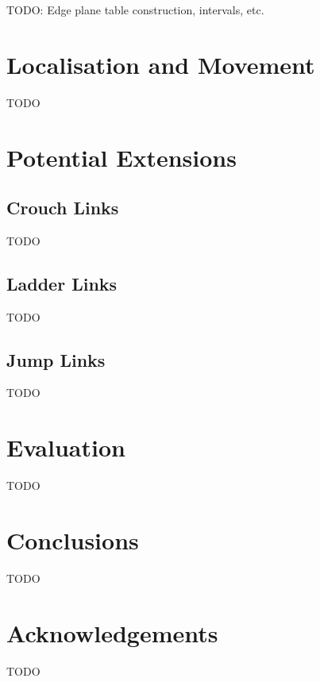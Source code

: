 \documentclass[12pt,onecolumn]{article}
\begin{document}
TODO: Edge plane table construction, intervals, etc.

\section*{Localisation and Movement}

TODO

\section*{Potential Extensions}

\subsection*{Crouch Links}

TODO

\subsection*{Ladder Links}

TODO

\subsection*{Jump Links}

TODO

\section*{Evaluation}

TODO

\section*{Conclusions}

TODO

\section*{Acknowledgements}

TODO

\nocite{*}



\end{document}
